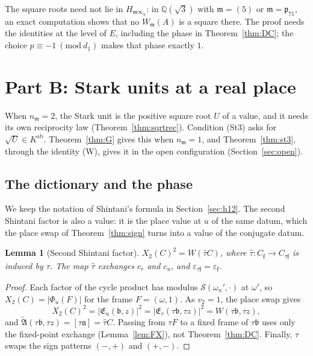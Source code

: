 \documentclass[11pt]{amsart}
\numberwithin{equation}{section}
\theoremstyle{plain}
\newtheorem{lemma}[theorem]{Lemma}
\theoremstyle{definition}
\theoremstyle{remark}
\begin{document}
The square roots need not lie in \(H_{\mathfrak m\infty_u}\): in \(\mathbb Q(\sqrt3)\) with \(\mathfrak m=(5)\) or \(\mathfrak m=\mathfrak p_{71}\), an exact computation shows that no \(W_{\mathfrak m}(A)\) is a square there. The proof needs the identities at the level of \(E\), including the phase in Theorem~\ref{thm:DC}; the choice \(p\equiv-1\ (\mathrm{mod}\ d_1)\) makes that phase exactly \(1\).

\section{Part B: Stark units at a real place}\label{sec:partB}

When \(n_{\mathfrak m}=2\), the Stark unit is the positive square root \(U\) of a value, and it needs its own reciprocity law (Theorem~\ref{thm:sqrtrec}). Condition (St3) asks for \(\sqrt U\in K^{\mathrm{ab}}\). Theorem~\ref{thm:G} gives this when \(n_{\mathfrak m}=1\), and Theorem~\ref{thm:st3}, through the identity (W), gives it in the open configuration (Section~\ref{sec:open}).

\subsection{The dictionary and the phase}\label{sec:dict}

We keep the notation of Shintani's formula in Section~\ref{sec:h12}. The second Shintani factor is also a value: it is the place value at \(u\) of the same datum, which the place swap of Theorem~\ref{thm:sign} turns into a value of the conjugate datum.

\begin{lemma}[Second Shintani factor]\label{lem:shintani2}
\(X_2(C)^2=W(\hat\tau C)\), where \(\hat\tau:C_{\mathfrak f}\to C_{\tau\mathfrak f}\) is induced by \(\tau\). The map \(\hat\tau\) exchanges \(c_r\) and \(c_u\), and \(\varepsilon_{\tau\mathfrak f}=\varepsilon_{\mathfrak f}\).
\end{lemma}

\begin{proof}
Each factor of the cycle product has modulus \(\mathcal S(\omega_n',\cdot)\) at \(\omega'\), so \(X_2(C)=|\Phi_u(F)|\) for the frame \(F=(\omega,1)\). As \(v_2=1\), the place swap gives
\[X_2(C)^2=|\mathfrak E_u(\mathfrak b,z)|^2=|\mathfrak E_r(\tau\mathfrak b,\tau z)|^2=W(\tau\mathfrak b,\tau z),\]
and \(\widetilde{\mathfrak A}(\tau\mathfrak b,\tau z)=[\tau\mathfrak a]=\hat\tau C\). Passing from \(\tau F\) to a fixed frame of \(\tau\mathfrak b\) uses only the fixed-point exchange (Lemma~\ref{lem:FX}), not Theorem~\ref{thm:DC}. Finally, \(\tau\) swaps the sign patterns \((-,+)\) and \((+,-)\).
\end{proof}
\end{document}
